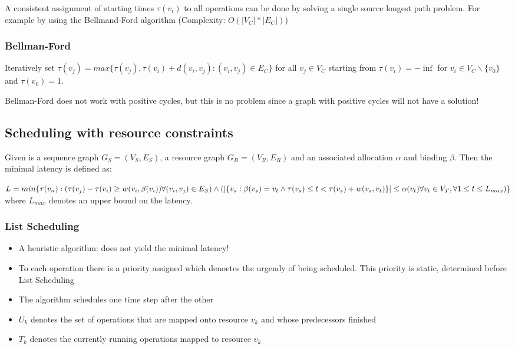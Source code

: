 A consistent assignment of starting times $\tau(v_i)$ to all operations can be done by solving a single source longest path problem. For example by using the Bellmand-Ford algorithm (Complexity: $O(|V_C|*|E_C|)$)

\subsubsection{Bellman-Ford}

Iteratively set $\tau(v_j) = max \{ \tau(v_j), \tau(v_i) + d(v_i, v_j) : (v_i, v_j) \in E_C  \}$ for all $v_j \in V_C$ starting from $\tau(v_i) = - \inf$ for $v_i \in V_C \backslash \{v_0\}$ and $\tau(v_0) = 1$.
\begin{tnote}
Bellman-Ford does not work with positive cycles, but this is no problem since a graph with positive cycles will not have a solution!
\end{tnote}



\subsection{Scheduling with resource constraints}

Given is a sequence graph $G_S = (V_S, E_S)$, a resource graph $G_R = (V_R, E_R)$ and an associated allocation $\alpha$ and binding $\beta$. Then the minimal latency is defined as:

$  L = min \{  \tau(v_n):  (  \tau(v_j) - \tau(v_i) \geq w(v_i, \beta(v_i) ) \forall (v_i, v_j) \in E_S) \land \\
	( | \{  v_s: \beta(v_s) = v_t \land \tau(v_s) \leq t  < \tau(v_s) + w(v_s, v_t)   \}  | \leq \alpha(v_t)  \\
	\forall v_t \in V_T, \forall 1 \leq t \leq L_{max} )
        \}  $
where $L_{max}$ denotes an upper bound on the latency.


\subsubsection{List Scheduling}

\begin{itemize}[noitemsep]
\item A heuristic algorithm: does not yield the minimal latency!
\item To each operation there is a priority assigned which denoetes the urgendy of being scheduled. This priority is static, determined before List Scheduling
\item The algorithm schedules one time step after the other
\item $U_k$ denotes the set of operations that are mapped onto resource $v_k$ and whose predecessors finished
\item $T_k$ denotes the currently running operations mapped to resource $v_k$
\end{itemize}

